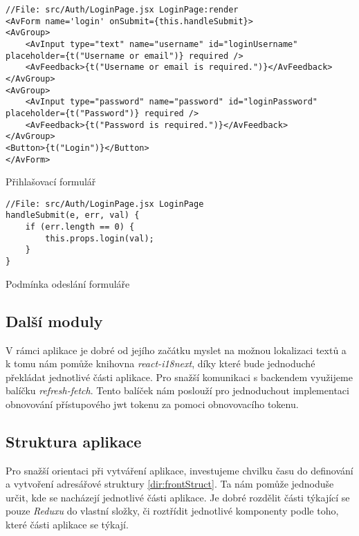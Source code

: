 \begin{listing}[H]
    \begin{verbatim}
//File: src/Auth/LoginPage.jsx LoginPage:render
<AvForm name='login' onSubmit={this.handleSubmit}>
<AvGroup>
    <AvInput type="text" name="username" id="loginUsername" placeholder={t("Username or email")} required />
    <AvFeedback>{t("Username or email is required.")}</AvFeedback>
</AvGroup>
<AvGroup>
    <AvInput type="password" name="password" id="loginPassword" placeholder={t("Password")} required />
    <AvFeedback>{t("Password is required.")}</AvFeedback>
</AvGroup>
<Button>{t("Login")}</Button>
</AvForm>
    \end{verbatim}
    \caption{Přihlašovací formulář}
    \label{lst:loginForm}
\end{listing}

\begin{listing}[H]
    \begin{verbatim}
//File: src/Auth/LoginPage.jsx LoginPage
handleSubmit(e, err, val) {
    if (err.length == 0) {
        this.props.login(val);
    }
}
    \end{verbatim}
    \caption{Podmínka odeslání formuláře}
    \label{lst:conditionForm}
\end{listing}

\subsection{Další moduly}

V rámci aplikace je dobré od jejího začátku myslet na možnou lokalizaci textů a k tomu nám pomůže knihovna \textit{react-i18next}, díky které bude jednoduché překládat
jednotlivé části aplikace. Pro snažší komunikaci s backendem využijeme balíčku \textit{refresh-fetch}. Tento balíček nám poslouží pro jednoduchout implementaci obnovování přístupového
\gls{jwt} tokenu za pomoci obnovovacího tokenu.

\clearpage

\subsection{Struktura aplikace}

Pro snažší orientaci při vytváření aplikace, investujeme chvilku času do definování a vytvoření adresářové struktury \ref{dir:frontStruct}. Ta nám
pomůže jednoduše určit, kde se nacházejí jednotlivé části aplikace. Je dobré rozdělit části týkající se pouze \textit{Reduxu} do vlastní složky, či roztřídit
jednotlivé komponenty podle toho, které části aplikace se týkají.

